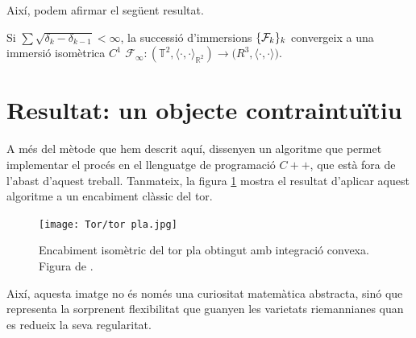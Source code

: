 Així, podem afirmar el següent resultat.
\begin{teo}
    Si $\sum\sqrt{\delta_k-\delta_{k-1}}<\infty$, la successió d'immersions $\{\mathcal F_k\}_k$ convergeix a una immersió isomètrica $C^1$ $\mathcal F_\infty:(\mathbb T^2, \langle\cdot, \cdot\rangle_{\mathbb R^2})\to\mathbb (R^3, \langle\cdot, \cdot\rangle)$.
\end{teo}

\section{Resultat: un objecte contraintuïtiu}
A més del mètode que hem descrit aquí, \cite{borrelli2013} dissenyen un algoritme que permet implementar el procés en el llenguatge de programació $C++$, que està fora de l'abast d'aquest treball. Tanmateix, la figura \ref{fig:tor_pl} mostra el resultat d'aplicar aquest algoritme a un encabiment clàssic del tor.
\begin{figure}[h!]
    \centering
    \texttt{[image: Tor/tor pla.jpg]}
    \caption{Encabiment isomètric del tor pla obtingut amb integració convexa. Figura de \cite{borrelli2013}.}
    \label{fig:tor_pl} 
\end{figure}

Així, aquesta imatge no és només una curiositat matemàtica abstracta, sinó que representa la sorprenent flexibilitat que guanyen les varietats riemannianes quan es redueix la seva regularitat.